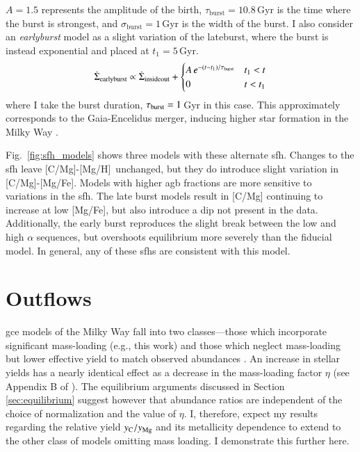 \documentclass[12pt,oneside,letterpaper]{report}
\newcommand{\agb}{\gls{agb}}
\newcommand{\sfh}{\gls{sfh}}
\newcommand{\Gce}{\Gls{gce}}
\newcommand{\caah}{[C/Mg]-[Mg/H]}
\newcommand{\caafe}{[C/Mg]-[Mg/Fe]}
\begin{document}
$A=1.5$ represents the amplitude of the birth, $\tau_\text{burst}=10.8$\,Gyr is the time where the burst is strongest, and $\sigma_\text{burst}=1$\,Gyr is the width of the burst.
I also consider an \textit{earlyburst} model as a slight variation of the lateburst, where the burst is instead exponential and placed at $t_1=5$\,Gyr. 
\begin{equation}\label{eq:twoinfall}
    \dot{\Sigma}_{\rm earlyburst} \propto \dot{\Sigma}_{\rm insideout} + 
\begin{cases}
    A\,e^{-(t-t_1)/\tau_{\rm burst}} & t_1 < t \\
      0 & t<t_1
\end{cases}
\end{equation}
where I take the burst duration, $\tau_{\rm burst}=1$\,Gyr in this case. 
This approximately corresponds to the Gaia-Encelidus merger, inducing higher star formation in the Milky Way \citep{spitoni21, bonaca20, helmi18}.

Fig.~\ref{fig:sfh_models} shows three models with these alternate \sfh{}. Changes to the \sfh{} leave \caah\ unchanged, but they do introduce slight variation in \caafe. Models with higher \agb{} fractions are more sensitive to variations in the \sfh{}. The late burst models result in [C/Mg] continuing to increase at low [Mg/Fe], but also introduce a dip not present in the data. Additionally, the early burst
reproduces the slight break between the low and high $\alpha$ sequences, but overshoots equilibrium more severely than the fiducial model. 
In general, any of these \sfh{}s are consistent with this model.

\section{Outflows} \label{sec:outflows}

\Gce{} models of the Milky Way fall into two classes---those which incorporate significant mass-loading (e.g., this work) and those which neglect mass-loading but lower effective yield to match observed abundances \citep[e.g.][]{MCM13, MCM14, spitoni19, spitoni20, spitoni21}.
An increase in stellar yields has a nearly identical effect as a decrease in the mass-loading factor $\eta$ (see Appendix B of \citealt{james_dwarf}).
The equilibrium arguments discussed in Section \ref{sec:equilibrium} suggest however that abundance ratios are independent of the choice of normalization and the value of $\eta$. I, therefore, expect my results regarding the relative yield $y_{\rm C}/y_{\rm Mg}$ and its metallicity dependence to extend to the other class of models omitting mass loading. I demonstrate this further here.
\end{document}
